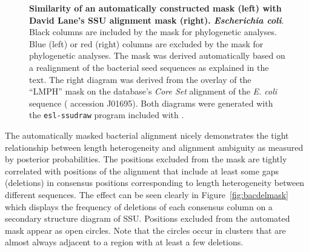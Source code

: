 \begin{figure}
{    \textbf{Similarity of an  automatically
      constructed mask (left) with David Lane's SSU alignment mask (right).
    \emph{Escherichia coli}}. Black columns are included by
  the mask for phylogenetic analyses. Blue (left) or red (right) columns are excluded
  by the mask for phylogenetic analyses. 
  The  mask was derived automatically based on a
    realignment of the bacterial seed sequences as explained in the
    text. The right diagram was derived from the overlay of the ``LMPH'' mask on the
   database's \emph{Core Set} alignment of the
  \emph{E. coli} sequence ( accession J01695). Both diagrams
    were generated with the {\tt esl-ssudraw} program included 
    with .}
\label{fig:infvlane}
\end{figure}

The automatically masked bacterial alignment nicely 
demonstrates the tight relationship between length heterogeneity
and alignment ambiguity as measured by posterior probabilities. 
The positions excluded from the mask are tightly
correlated with positions of the alignment that include at least some
gaps (deletions) in consensus positions corresponding to length
heterogeneity between different sequences. The effect can be seen
clearly in Figure~\ref{fig:bacdelmask} which displays the frequency of
deletions of each consensus column on a secondary structure diagram of
SSU. Positions excluded from the automated mask appear as open
circles. Note that the circles occur in clusters that are almost
always adjacent to a region with at least a few deletions. 

